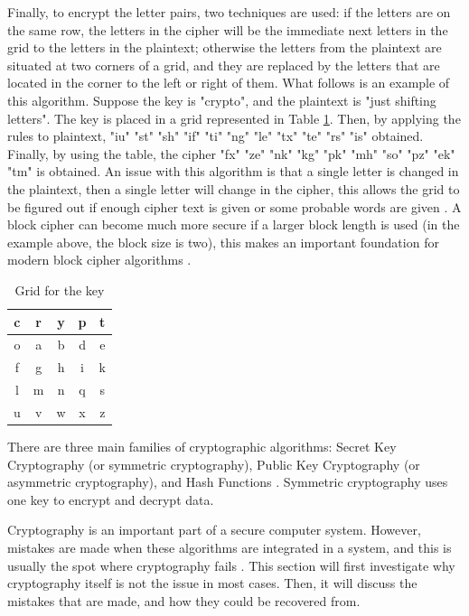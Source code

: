 \documentclass{l4proj}
\begin{document}
Finally, to encrypt the letter pairs, two techniques are used: if the letters are on the same row, the letters in the cipher will be the immediate next letters in the grid 
to the letters in the plaintext; otherwise the letters from the plaintext are situated at two corners of a grid, and they are replaced by the letters that are located in the corner to the left or right of them. 
What follows is an example of this algorithm. Suppose the key is "crypto", and the plaintext is "just shifting letters".
The key is placed in a grid represented in Table \ref{tab:key}. Then, by applying the rules to plaintext, "iu" "st" "sh" "if" "ti" "ng" "le" "tx" "te" "rs" "is" obtained.
Finally, by using the table, the cipher "fx" "ze" "nk" "kg" "pk" "mh" "so" "pz" "ek" "tm" is obtained. An issue with this algorithm is that a single letter is changed in the plaintext,
then a single letter will change in the cipher, this allows the grid to be figured out if enough cipher text is given or some probable words are given \citep{anderson_security_2008}.
A block cipher can become much more secure if a larger block length is used (in the example above, the block size is two), this makes an important foundation for modern block cipher algorithms
\citep{anderson_security_2008}. 

    \begin{table}[]
    \centering
    \begin{tabular}{|c|c|c|c|c|}
        \hline
        c & r & y & p & t \\
        \hline
        o & a & b & d & e \\
        \hline
        f & g & h & i & k \\
        \hline
        l & m & n & q & s \\
        \hline
        u & v & w & x & z \\
        \hline
    \end{tabular}
    \caption{Grid for the key}\label{tab:key}
    \end{table}

There are three main families of cryptographic algorithms: Secret Key Cryptography (or symmetric cryptography), Public Key Cryptography (or asymmetric cryptography), and
Hash Functions \citep{kessler_overview_2016} \citep{savage_cse_2019}. Symmetric cryptography uses one key to encrypt and decrypt data.


Cryptography is an important part of a secure computer system. However, mistakes are made when these algorithms are integrated in a system,
and this is usually the spot where cryptography fails \citep{lazar_why_nodate}. This section will first investigate why cryptography itself is not the issue in most cases.
Then, it will discuss the mistakes that are made, and how they could be recovered from.
\end{document}

